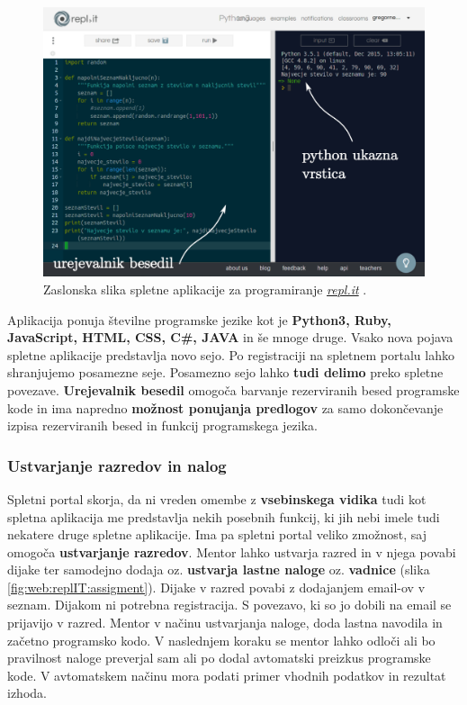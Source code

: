 \begin{figure}[h!]
  \centering
    \includegraphics [width=0.65\linewidth, keepaspectratio =
   1] {./images/sc_web/replIT_main-v01.jpg}
   \caption{Zaslonska slika spletne aplikacije za programiranje
     \emph{\href{https://repl.it/}{repl.it}} \cite{web:replIT}.}
    \label{fig:web:replIT}
\end{figure}

Aplikacija ponuja številne programske jezike kot je \textbf{Python3,
  Ruby, JavaScript, HTML, CSS, C\#, JAVA} in še mnoge druge. Vsako nova
pojava spletne aplikacije predstavlja novo sejo. Po registraciji na
spletnem portalu lahko shranjujemo posamezne seje. Posamezno sejo
lahko \textbf{tudi delimo} preko spletne povezave. \textbf{Urejevalnik
  besedil} omogoča barvanje rezerviranih besed programske kode in ima napredno
\textbf{možnost ponujanja predlogov} za samo dokončevanje izpisa
rezerviranih besed in funkcij programskega jezika.

\subsubsection{Ustvarjanje razredov in nalog}
\label{sec:ustvarjanje_raz_nalog}

Spletni portal skorja, da ni vreden omembe z \textbf{vsebinskega
  vidika} tudi kot spletna aplikacija me predstavlja nekih posebnih
funkcij, ki jih nebi imele tudi nekatere druge spletne aplikacije. Ima
pa spletni portal veliko zmožnost, saj omogoča \textbf{ustvarjanje
  razredov}. Mentor lahko ustvarja razred in v njega povabi dijake ter
samodejno dodaja oz. \textbf{ustvarja lastne naloge}
oz. \textbf{vadnice} (slika \ref{fig:web:replIT:assigment}). Dijake v
razred povabi z dodajanjem email-ov v seznam. Dijakom ni potrebna
registracija. S povezavo, ki so jo dobili na email se prijavijo v
razred. Mentor v načinu ustvarjanja naloge, doda lastna navodila in
začetno programsko kodo. V naslednjem koraku se mentor lahko odloči
ali bo pravilnost naloge preverjal sam ali po dodal avtomatski
preizkus programske kode. V avtomatskem načinu mora podati primer
vhodnih podatkov in rezultat izhoda.

